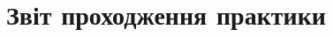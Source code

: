 \documentclass[a4paper,14pt]{extreport}
\begin{document}
	
\chapter*{Звіт проходження практики}
\setcounter{chapter}{1}






\end{document}
